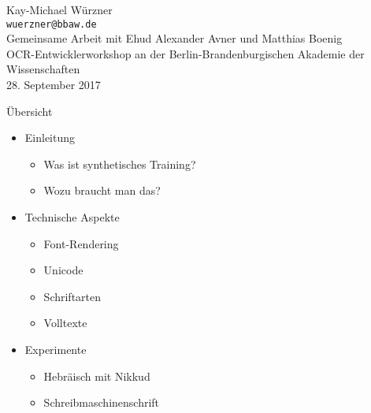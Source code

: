 \documentclass{bbawslides}
\begin{document}
\providecommand{\Title}{}


\begin{bbawtitle}
  \vspace*{2em}%
  Kay-Michael Würzner\\[-.25em]%
  \textcolor{urlColor}{\texttt{{\small wuerzner@bbaw.de}}}
  \\[0.5em]
  {\small Gemeinsame Arbeit mit Ehud Alexander Avner und Matthias Boenig}
  \\[1.5em]
  {\footnotesize{%
    OCR-Entwicklerworkshop an der Berlin-Brandenburgischen Akademie der Wissenschaften\\%
    28. September 2017\\%
  }}
\end{bbawtitle}
\slideStyleFrame

\renewcommand{\footerText}{\tiny 28. September 2017, OCR-Entwicklerworkshop, BBAW}

\begin{bbawslide}{Übersicht}
  \vspace*{7mm}%
  \centerslidestrue%
  \begin{itemize}
    \item Einleitung
    \begin{itemize}\small
      \item Was ist synthetisches Training?
      \item Wozu braucht man das?
    \end{itemize}
    \item Technische Aspekte
    \begin{itemize}\small
      \item Font-Rendering
      \item Unicode
      \item Schriftarten
      \item Volltexte
    \end{itemize}
    \item Experimente
    \begin{itemize}\small
      \item Hebräisch mit Nikkud
      \item Schreibmaschinenschrift
    \end{itemize}
  \end{itemize}
\end{bbawslide}
\end{document}
